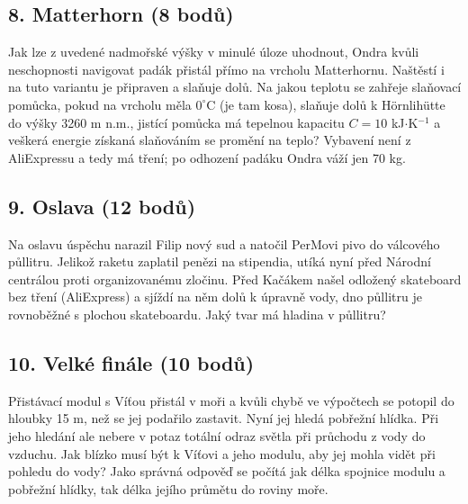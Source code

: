 \documentclass[12pt,a4paper]{article}
\begin{document}
\subsection*{8. Matterhorn (8 bodů)}
Jak lze z uvedené nadmořské výšky v minulé úloze uhodnout, Ondra kvůli neschopnosti navigovat padák přistál přímo na vrcholu Matterhornu. Naštěstí i na tuto variantu je připraven a slaňuje dolů. Na jakou teplotu se zahřeje slaňovací pomůcka, pokud na vrcholu měla $0^\circ$C (je tam kosa), slaňuje dolů k Hörnlihütte do výšky 3260 m n.m., jistící pomůcka má tepelnou kapacitu $C = 10$ kJ$\cdot$K$^{-1}$ a veškerá energie získaná slaňováním se promění na teplo? Vybavení není z AliExpressu a tedy má tření; po odhození padáku Ondra váží jen 70 kg.

\subsection*{9. Oslava (12 bodů)}
Na oslavu úspěchu narazil Filip nový sud a natočil PerMovi pivo do válcového půllitru. Jelikož raketu zaplatil penězi na stipendia, utíká nyní před Národní centrálou proti organizovanému zločinu. Před Kačákem našel odložený skateboard bez tření (AliExpress) a sjíždí na něm dolů k úpravně vody, dno půllitru je rovnoběžné s plochou skateboardu. Jaký tvar má hladina v půllitru?

\subsection*{10. Velké finále (10 bodů)}
Přistávací modul s Víťou přistál v moři a kvůli chybě ve výpočtech se potopil do hloubky 15 m, než se jej podařilo zastavit. Nyní jej hledá pobřežní hlídka. Při jeho hledání ale nebere v potaz totální odraz světla při průchodu z vody do vzduchu. Jak blízko musí být k Víťovi a jeho modulu, aby jej mohla vidět při pohledu do vody? Jako správná odpověď se počítá jak délka spojnice modulu a pobřežní hlídky, tak délka jejího průmětu do roviny moře.
\end{document}
